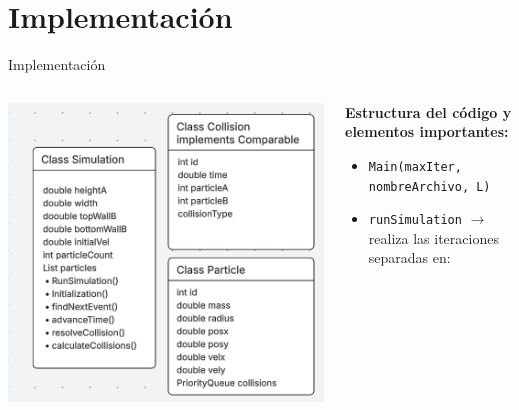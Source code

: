 \documentclass{beamer}
\begin{document}
\section{Implementación}
\begin{frame}{Implementación}
  \begin{columns}
    \begin{column}{0.4\textwidth}
      {\scriptsize
        \begin{center}
          \includegraphics[width=0.9\linewidth]{photoMaterial/uml.jpg}
        \end{center}
      }
    \end{column}
    \begin{column}{0.6\textwidth}
      {\scriptsize
        \textbf{Estructura del código y elementos importantes:}
        \begin{itemize}
          \item \texttt{Main(maxIter, nombreArchivo, L)}
          \item \texttt{runSimulation} $\rightarrow$ realiza las iteraciones separadas en:
\end{itemize}}
\end{column}
\end{columns}
\end{frame}
\end{document}
